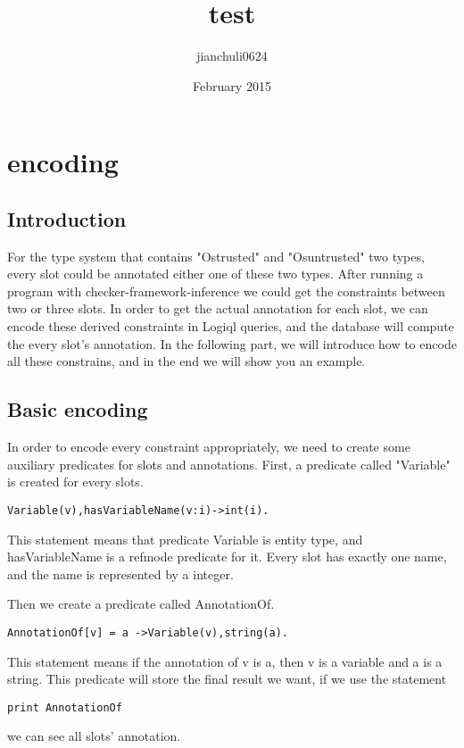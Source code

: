 \documentclass{article}
\title{test}
\author{jianchuli0624 }
\date{February 2015}
\begin{document}

\section{encoding}
\subsection{Introduction}
For the type system that contains "Ostrusted" and "Osuntrusted" two types, every slot could be annotated either one of these two types.  After running a program with checker-framework-inference we could get the constraints between two or three slots.  In order to get the actual annotation for each slot, we can encode these derived constraints in Logiql queries, and the database will compute the every slot's annotation.  
In the following part, we will introduce how to encode all these constrains, and in the end we will show you an example.
\subsection{Basic encoding}
In order to encode every constraint appropriately, we need to create some auxiliary predicates for slots and annotations.
First, a predicate called "Variable" is created for every slots.
\begin{lstlisting}
Variable(v),hasVariableName(v:i)->int(i).
\end{lstlisting}
This statement means that predicate Variable is entity type, and hasVariableName is a refmode predicate for it.  Every slot has exactly one name, and the name is represented by a integer.

Then we create a predicate called AnnotationOf.
\begin{lstlisting}
AnnotationOf[v] = a ->Variable(v),string(a).
\end{lstlisting}
This statement means if the annotation of v is a, then v is a variable and a is a string.  This predicate will store the final result we want, if we use the statement 
\begin{lstlisting}
print AnnotationOf
\end{lstlisting}
we can see all slots' annotation.
\end{document}
